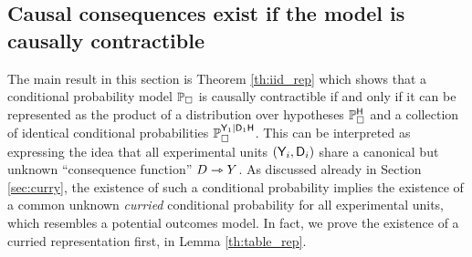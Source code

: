 






\subsection{Causal consequences exist if the model is causally contractible}

The main result in this section is Theorem \ref{th:iid_rep} which shows that a conditional probability model $\mathbb{P}_\square$ is causally contractible if and only if it can be represented as the product of a distribution over hypotheses $\mathbb{P}_\square^{\mathsf{H}}$ and a collection of identical conditional probabilities $\mathbb{P}_\square^{\mathsf{Y}_1|\mathsf{D}_1\mathsf{H}}$. This can be interpreted as expressing the idea that all experimental units $(\mathsf{Y}_i,\mathsf{D}_i)$ share a canonical but unknown ``consequence function'' $D\rightarrowtriangle Y$. As discussed already in Section \ref{sec:curry}, the existence of such a conditional probability implies the existence of a common unknown \emph{curried} conditional probability for all experimental units, which resembles a potential outcomes model. In fact, we prove the existence of a curried representation first, in Lemma \ref{th:table_rep}.

